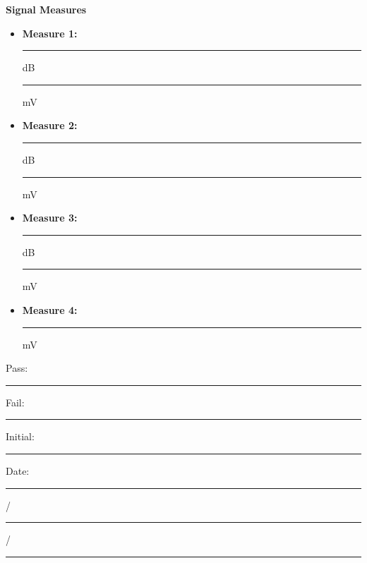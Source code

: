 \textbf{Signal Measures}
\begin{itemize}
\item \textbf{Measure 1:} \rule{3cm}{0.15mm} dB \hspace{1cm} \rule{3cm}{0.15mm} mV
\item \textbf{Measure 2:} \rule{3cm}{0.15mm} dB \hspace{1cm} \rule{3cm}{0.15mm} mV
\item \textbf{Measure 3:} \rule{3cm}{0.15mm} dB \hspace{1cm} \rule{3cm}{0.15mm} mV
\item \textbf{Measure 4:} \rule{3cm}{0.15mm} mV
\end{itemize}


\vfill
{\large Pass: \rule{1cm}{0.15mm} \hspace{1cm} Fail: \rule{1cm}{0.15mm}} \hfill Initial: \rule{2cm}{0.15mm} \hspace{1cm} Date: \rule{0.5cm}{0.15mm}/\rule{0.5cm}{0.15mm}/\rule{1cm}{0.15mm}\\[5pt]